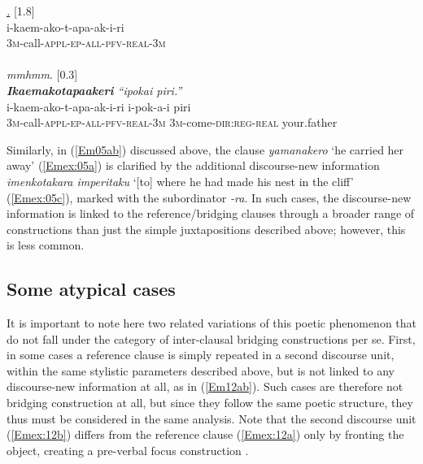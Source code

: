 \documentclass[output=paper]{LSP/langsci}
\begin{document}
\begin{exe}
\ex \label{Em11ac}
\begin{xlist}
\ex \label{Emex:11a}
\glt \textit{\underline{.} } [1.8]\\
\gll i-kaem-ako-t-apa-ak-i-ri\\
 \textsc{3m-}call\textsc{-appl-ep-all-pfv-real-3m}\\
\glt {}\\
\ex \label{Emex:11b}
\glt \textit{mmhmm}. [0.3]\\
\ex \label{Emex:11c}
\glt \textit{\textbf{Ikaemakotapaakeri} ``ipokai piri.''}\\
\gll i-kaem-ako-t-apa-ak-i-ri i-pok-a-i piri\\     	      
   \textsc{3m-}call\textsc{-appl-ep-all-pfv-real-3m} \textsc{3m-}come\textsc{-dir:reg-real} your.father\\   
\glt {}
\end{xlist}
\end{exe}
%
Similarly, in (\ref{Em05ab}) discussed above, the clause \textit{yamanakero} `he carried her away' (\ref{Emex:05a}) is clarified by the additional discourse-new information \textit{imenkotakara imperitaku} `[to] where he had made his nest in the cliff' (\ref{Emex:05c}), marked with the subordinator \textit{-ra}. In such cases, the discourse-new information is linked to the reference/bridging clauses through a broader range of constructions than just the simple juxtapositions described above; however, this is less common.
%
\subsection{Some atypical cases}
\label{Ematypical}
It is important to note here two related variations of this poetic phenomenon that do not fall under the category of inter-clausal bridging constructions per se. First, in some cases a reference clause is simply repeated in a second discourse unit, within the same stylistic parameters described above, but is not linked to any discourse-new information at all, as in (\ref{Em12ab}). Such cases are therefore not bridging construction at all, but since they follow the same poetic structure, they thus must be considered in the same analysis. Note that the second discourse unit (\ref{Emex:12b}) differs from the reference clause (\ref{Emex:12a}) only by fronting the object, creating a pre-verbal focus construction \citep[][385]{michael08}.
\end{document}

